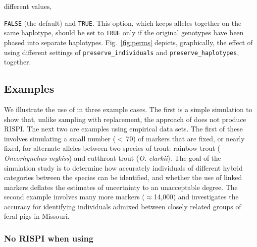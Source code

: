 different values, {{\tt\footnotesize FALSE} (the default) and {\tt\footnotesize TRUE}.
This option, which keeps alleles together
on the same haplotype, should be set to {\tt TRUE} only
if the original genotypes have been phased into separate haplotypes.
Fig.~\ref{fig:perms} depicts, graphically, the effect of using different settings of
{\tt\footnotesize preserve\_individuals} and 
{\tt\footnotesize preserve\_haplotypes}, together.


%

\subsection*{Examples}

We illustrate the use of \gscramble{} in three example cases. The first is
a simple simulation to show that, unlike sampling with replacement, the
approach of \gscramble{} does not produce RISPI.
The next two are examples using empirical data sets.
The first of these involves
simulating a small number ($<\,$70) of markers that are fixed, or nearly
fixed, for alternate alleles between two species of trout: rainbow trout ({\em 
Oncorhynchus mykiss}) and cutthroat trout ({\em O. clarkii}). The goal of the 
simulation study is to determine how accurately individuals of different hybrid
categories between the species can be identified, and whether the use of linked 
markers deflates the estimates of uncertainty to an unacceptable degree.  The 
second example involves many more markers ($\approx$14,000) and 
investigates the accuracy for
identifying individuals admixed between closely related groups of feral
pigs in Missouri.  

\subsubsection*{No RISPI when using \gscramble{}}

}
